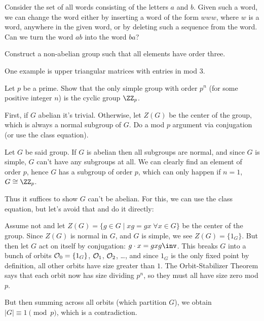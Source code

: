 \begin{problem}
	\gim
	Consider the set of all words consisting of the letters $a$ and $b$.
	Given such a word, we can change the word either by inserting a word of the form $www$,
	where $w$ is a word, anywhere in the given word, or by deleting such a sequence from the word.
	Can we turn the word $ab$ into the word $ba$?
	\begin{hint}
		Construct a non-abelian group such that all elements have order three.
	\end{hint}
	\begin{sol}
		One example is upper triangular matrices with entries in mod $3$.
	\end{sol}
\end{problem}

\begin{problem}
	\yod
	Let $p$ be a prime.
	Show that the only simple group with order $p^n$
	(for some positive integer $n$)
	is the cyclic group $\Zc p$.

	\begin{hint}
		First, if $G$ abelian it's trivial.
		Otherwise, let $Z(G)$ be the center of the group,
		which is always a normal subgroup of $G$.
		Do a mod $p$ argument via conjugation (or use the class equation).
	\end{hint}
	\begin{sol}
		Let $G$ be said group.
		If $G$ is abelian then all subgroups are normal,
		and since $G$ is simple, $G$ can't have any subgroups at all.
		We can clearly find an element of order $p$, hence $G$ has a subgroup
		of order $p$, which can only happen if $n=1$, $G \cong \Zc p$.

		Thus it suffices to show $G$ can't be abelian.
		For this, we can use the class equation, but let's avoid that and do it directly:

		Assume not and let $Z(G) = \{ g \in G \mid xg = gx \; \forall x \in G \}$
		be the center of the group.
		Since $Z(G)$ is normal in $G$, and $G$ is simple, we see $Z(G) = \{1_G\}$.
		But then let $G$ act on itself by conjugation: $g \cdot x = gxg\inv$.
		This breaks $G$ into a bunch of orbits $\mathcal O_0 = \{1_G\}$, $\mathcal O_1$, $\mathcal O_2$, \dots,
		and since $1_G$ is the only fixed point by definition, all other orbits
		have size greater than $1$.
		The Orbit-Stabilizer Theorem says that each orbit now has size dividing $p^n$,
		so they must all have size zero mod $p$.

		But then summing across all orbits (which partition $G$),
		we obtain $\left\lvert G \right\rvert \equiv 1 \pmod p$,
		which is a contradiction.
	\end{sol}
\end{problem}


